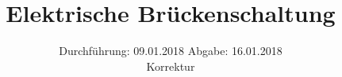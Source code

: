

\subject{V302}
\title{Elektrische Brückenschaltung}
\date{%
  Durchführung: 09.01.2018
  \hspace{3em}
  Abgabe: 16.01.2018 \\
  Korrektur
}



\maketitle
\thispagestyle{empty}
\tableofcontents
\newpage






\printbibliography{}


